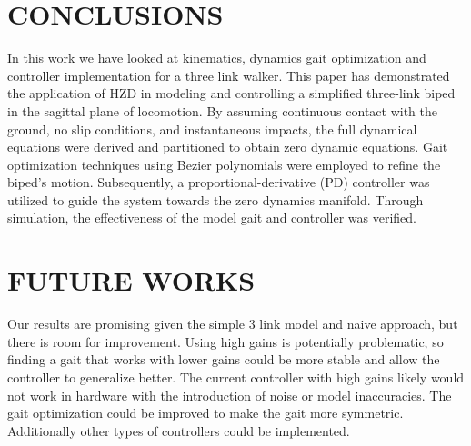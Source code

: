 \documentclass[letterpaper, 10 pt, conference]{ieeeconf}  %
\begin{document}
\section{CONCLUSIONS}
In this work we have looked at kinematics, dynamics gait optimization and controller implementation for a three link walker. This paper has demonstrated the application of HZD in modeling and controlling a simplified three-link biped in the sagittal plane of locomotion. By assuming continuous contact with the ground, no slip conditions, and instantaneous impacts, the full dynamical equations were derived and partitioned to obtain zero dynamic equations. Gait optimization techniques using Bezier polynomials were employed to refine the biped's motion. Subsequently, a proportional-derivative (PD) controller was utilized to guide the system towards the zero dynamics manifold. Through simulation, the effectiveness of the model gait and controller was verified.

\section{FUTURE WORKS}
Our results are promising given the simple 3 link model and naive approach, but there is room for improvement. Using high gains is potentially problematic, so finding a gait that works with lower gains could be more stable and allow the controller to generalize better. The current controller with high gains likely would not work in hardware with the introduction of noise or model inaccuracies. The gait optimization could be improved to make the gait more symmetric. Additionally other types of controllers could be implemented.



\addtolength{\textheight}{-12cm}   %

\end{document}
